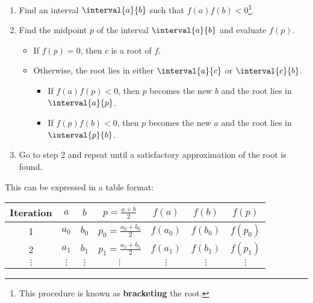 \documentclass{article}
\begin{document}
\begin{enumerate}
    \item Find an interval \(\interval{a}{b}\) such that \(f\left( a \right) f\left( b \right) < 0\)\footnote{This procedure is known as \textbf{bracketing} the root.}.
    \item Find the midpoint \(p\) of the interval \(\interval{a}{b}\) and evaluate \(f\left( p \right)\).
          \begin{itemize}
              \item If \(f\left( p \right) = 0\), then \(c\) is a root of \(f\).
              \item Otherwise, the root lies in either \(\interval{a}{c}\) or \(\interval{c}{b}\).
                    \begin{itemize}
                        \item If \(f\left( a \right) f\left( p \right) < 0\), then \(p\) becomes the new \(b\) and the root lies in \(\interval{a}{p}\).
                        \item If \(f\left( p \right) f\left( b \right) < 0\), then \(p\) becomes the new \(a\) and the root lies in \(\interval{p}{b}\).
                    \end{itemize}
          \end{itemize}
    \item Go to step 2 and repeat until a satisfactory approximation of the root is found.
\end{enumerate}
This can be expressed in a table format:
\begin{table}[H]
    \centering
    \begin{tabular}{ccccccc}
        \toprule
        \textbf{Iteration} & \(a\)      & \(b\)      & \(p = \frac{a + b}{2}\)       & \(f\left( a \right)\)   & \(f\left( b \right)\)   & \(f\left( p \right)\)   \\
        \midrule
        1                  & \(a_0\)    & \(b_0\)    & \(p_0 = \frac{a_0 + b_0}{2}\) & \(f\left( a_0 \right)\) & \(f\left( b_0 \right)\) & \(f\left( p_0 \right)\) \\
        2                  & \(a_1\)    & \(b_1\)    & \(p_1 = \frac{a_1 + b_1}{2}\) & \(f\left( a_1 \right)\) & \(f\left( b_1 \right)\) & \(f\left( p_1 \right)\) \\
        \(\vdots\)         & \(\vdots\) & \(\vdots\) & \(\vdots\)                    & \(\vdots\)              & \(\vdots\)              & \(\vdots\)              \\
        \bottomrule
    \end{tabular}
\end{table}
\end{document}
